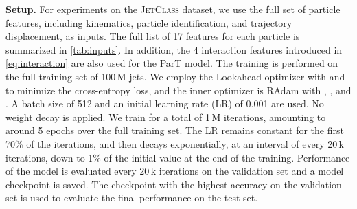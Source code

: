 \documentclass[nohyperref]{article}
\theoremstyle{plain}
\theoremstyle{definition}
\theoremstyle{remark}
\newcommand{\jetclass}{{\textsc{JetClass}}\xspace}
\begin{document}
\textbf{Setup.} For experiments on the \jetclass dataset, we use the full set of particle features, including kinematics, particle identification, and trajectory displacement, as inputs. The full list of 17 features for each particle is summarized in \cref{tab:inputs}. In addition, the 4 interaction features introduced in \cref{eq:interaction} are also used for the ParT model. The training is performed on the full training set of 100\,M jets. We employ the Lookahead optimizer \cite{NEURIPS2019_90fd4f88} with  and  to minimize the cross-entropy loss, and the inner optimizer is RAdam \cite{Liu2020On} with , , and . A batch size of 512 and an initial learning rate (LR) of 0.001 are used. No weight decay is applied. We train for a total of 1\,M iterations, amounting to around 5 epochs over the full training set. The LR remains constant for the first 70\% of the iterations, and then decays exponentially, at an interval of every 20\,k iterations, down to 1\% of the initial value at the end of the training. Performance of the model is evaluated every 20\,k iterations on the validation set and a model checkpoint is saved. The checkpoint with the highest accuracy on the validation set is used to evaluate the final performance on the test set. 
\end{document}
